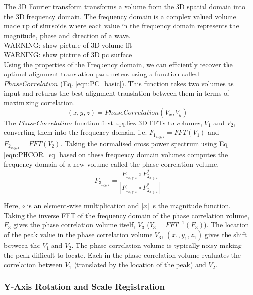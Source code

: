 The 3D Fourier transform transforms a volume from the 3D spatial domain into the 3D frequency domain. The frequency domain is a complex valued volume made up of sinusoids where each value in the frequency domain represents the magnitude, phase and direction of a wave.  \\


WARNING: show picture of 3D volume fft\\

WARNING: show picture of 3D pc surface\\

Using the properties of the Frequency domain, we can efficiently recover the optimal alignment translation parameters using a function called $PhaseCorrelation$ (Eq. \ref{eqn:PC_basic}). This function takes two volumes as input and returns the best alignment translation between them in terms of maximizing correlation.
\begin{equation} \label{eqn:PC_basic}
(x, y, z) = PhaseCorrelation(V_x, V_y)
\end{equation}
The $PhaseCorrelation$ function first applies 3D FFTs to volumes, $V_1$ and $V_2$, converting them into the frequency domain, i.e. $F_{1_{x,y,z}} = FFT(V_1)$ and $F_{2_{x,y,z}} = FFT(V_2)$. Taking the normalised cross power spectrum using Eq. \ref{eqn:PHCOR_eq} based on these frequency domain volumes computes the frequency domain of a new volume called the phase correlation volume. \\


\begin{equation} \label{eqn:PHCOR_eq}
F_{3_{x,y,z}} = \frac{F_{1_{x,y,z}} \circ F_{2_{x,y,z}}^*}{ | F_{1_{x,y,z}} \circ F_{2_{x,y,z}}^* | }
\end{equation}

Here, $\circ$ is an element-wise multiplication and $|x|$ is the magnitude function. Taking the inverse FFT of the frequency domain of the phase correlation volume, $F_3$ gives the phase correlation volume itself, $V_3$ ($V_3 = FFT^{-1}(F_3)$). The location of the peak value in the phase correlation volume $V_3$, $(x_1, y_1, z_1)$ gives the shift between the $V_1$ and $V_2$. The phase correlation volume is typically noisy making the peak difficult to locate. Each in the phase correlation volume evaluates the correlation between $V_1$ (translated by the location of the peak) and $V_2$.


\subsubsection{Y-Axis Rotation and Scale Registration}


